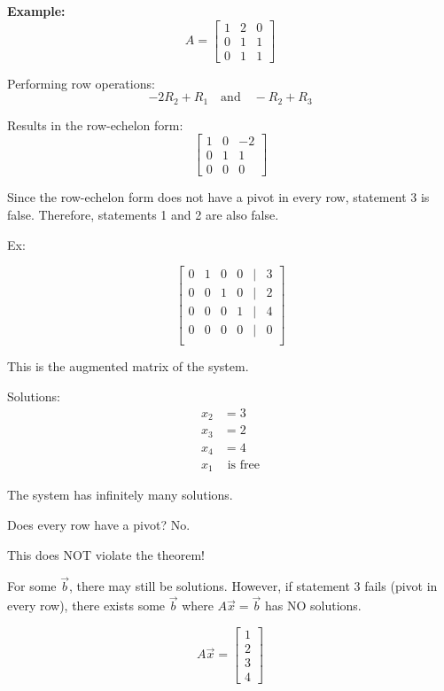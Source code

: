 \documentclass{article}
\begin{document}
\textbf{Example:}
\[ A = \begin{bmatrix}
    1 & 2 & 0 \\
    0 & 1 & 1 \\
    0 & 1 & 1
\end{bmatrix} \]

Performing row operations:
\[
-2R_2 + R_1 \quad \text{and} \quad -R_2 + R_3
\]

Results in the row-echelon form:
\[
\begin{bmatrix}
    1 & 0 & -2 \\
    0 & 1 & 1 \\
    0 & 0 & 0
\end{bmatrix}
\]

Since the row-echelon form does not have a pivot in every row, statement 3 is false. Therefore, statements 1 and 2 are also false.

Ex: 

\[
\begin{bmatrix}
    0 & 1 & 0 & 0 & \vert & 3 \\
    0 & 0 & 1 & 0 & \vert & 2 \\
    0 & 0 & 0 & 1 & \vert & 4 \\
    0 & 0 & 0 & 0 & \vert & 0 \\
\end{bmatrix}
\]

This is the augmented matrix of the system.

Solutions:
\[
\begin{aligned}
    x_2 &= 3 \\
    x_3 &= 2 \\
    x_4 &= 4 \\
    x_1 & \text{ is free}
\end{aligned}
\]

The system has infinitely many solutions.

Does every row have a pivot? No.

This does NOT violate the theorem!

For some \(\vec{b}\), there may still be solutions. However, if statement 3 fails (pivot in every row), there exists some \(\vec{b}\) where \(A\vec{x} = \vec{b}\) has NO solutions.

\[ A\vec{x} = \begin{bmatrix} 1 \\ 2 \\ 3 \\ 4 \end{bmatrix} \]
\end{document}
